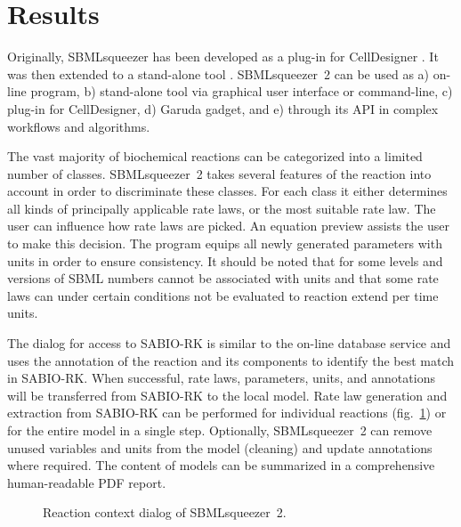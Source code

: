 \documentclass{bioinfo}
\begin{document}
\vspace{-.1cm}
\section{Results}

Originally, SBMLsqueezer has been developed as a plug-in for CellDesigner \citep{Draeger2008}.
It was then extended to a %
stand-alone tool \citep{Draeger2010}.
SBMLsqueezer~2 can be used as
a) on-line program,
b) stand-alone tool via graphical user interface or command-line,
c) plug-in for CellDesigner,
d) Garuda gadget, and
e) through its API in complex workflows and algorithms.

The vast majority of biochemical reactions can be categorized into a limited number of classes.
SBMLsqueezer~2 takes several features of the reaction into account in order to discriminate these classes.
For each class it either determines all kinds of principally applicable rate laws, or the most suitable rate law.
The user can influence how rate laws are picked.
An equation preview assists the user to make this decision.
The program equips all newly generated parameters with units in order to ensure consistency.
It should be noted that for some levels and versions of SBML numbers cannot be associated with units and that some rate laws can under certain conditions not be evaluated to reaction extend per time units.

The dialog for access to SABIO-RK is similar to %
the on-line database service and %
uses the annotation of the reaction and its components to identify the best match in SABIO-RK.
When successful, rate laws, parameters, units, and annotations will be transferred from SABIO-RK to the local model.
%
Rate law generation and extraction from SABIO-RK can be performed for individual reactions (fig.~\ref{fig:SBMLsqueezer}) or for the entire model in a single step.
%
Optionally, SBMLsqueezer~2 can remove unused variables and units from the model (cleaning) and update annotations where required.
The content of models can be summarized in a comprehensive human-readable PDF report.

\begin{figure}
\caption[Reaction context dialog of SBMLsqueezer~2]{Reaction context dialog of SBMLsqueezer~2.}\label{fig:SBMLsqueezer}
\vspace{-.2cm}
\end{figure}
\end{document}

